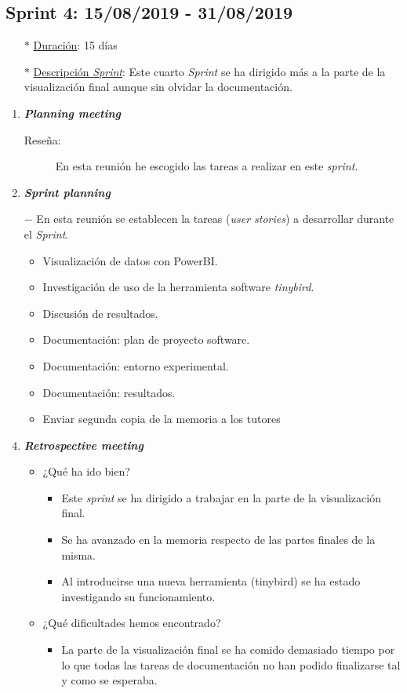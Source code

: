 \subsection{Sprint 4: 15/08/2019 - 31/08/2019}\label{sprint4}
\begin{itemize}
	\item[$\ast$] \underline{Duración}:  15 días
	\item[$\ast$] \underline{Descripción \textit{Sprint}}: Este cuarto \textit{Sprint} se ha dirigido más a la parte de la visualización final aunque sin olvidar la documentación.
\end{itemize}
\begin{enumerate}
	\item \textbf{\textit{Planning meeting}}
	\begin{description}
		\item[Reseña:] En esta reunión he escogido las tareas a realizar en este \textit{sprint}.
	\end{description}
	\item \textbf{\textit{Sprint planning}}
	\item[$-$] En esta reunión se establecen la tareas (\textit{user stories}) a desarrollar durante el \textit{Sprint}. 
	\begin{itemize}
		\item Visualización de datos con PowerBI.
		\item Investigación de uso de la herramienta software \textit{tinybird}.
		\item Discusión de resultados.
		\item Documentación: plan de proyecto software.
		\item Documentación: entorno experimental.
		\item Documentación: resultados.
		\item Enviar segunda copia de la memoria a los tutores
	\end{itemize}
	\item \textbf{\textit{Retrospective meeting}}
	\begin{itemize}
		\item ¿Qué ha ido bien?
		\begin{itemize}
			\item Este \textit{sprint} se ha dirigido a trabajar en la parte de la visualización final.
			\item Se ha avanzado en la memoria respecto de las partes finales de la misma. 
			\item Al introducirse una nueva herramienta (tinybird) se ha estado investigando su funcionamiento.
		\end{itemize}
		\item ¿Qué dificultades hemos encontrado?
		\begin{itemize}
			\item La parte de la visualización final se ha comido demasiado tiempo por lo que todas las tareas de documentación no han podido finalizarse tal y como se esperaba.
		\end{itemize}
	\end{itemize}	
\end{enumerate}

